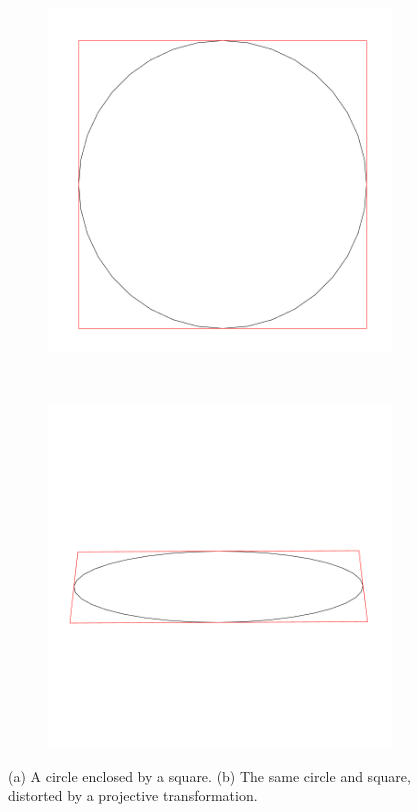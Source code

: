 \begin{figure}
	\centering
	\begin{subfigure}[b]{0.4\textwidth}
		\includegraphics[width=\textwidth]{figures/circle.png}
		\caption{}
		\label{fig:circle}
	\end{subfigure}
	~~~
	\begin{subfigure}[b]{0.4\textwidth}
		\includegraphics[width=\textwidth]{figures/circle_perspective.png}
		\caption{}
		\label{fig:circle_perspective}
	\end{subfigure}
		\caption{(a) A circle enclosed by a square. (b) The same circle and square, distorted by a projective transformation.}\label{fig:perspective}
\end{figure}